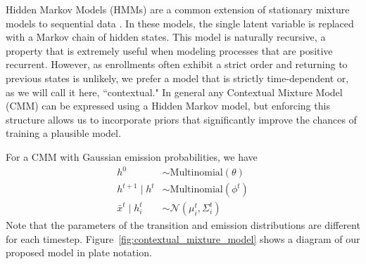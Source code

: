 \documentclass{edm_template}
\begin{document}
Hidden Markov Models (HMMs) are a common extension of stationary mixture models to sequential data \cite{rabiner1989tutorial}. In these models, the single latent variable is replaced with a Markov chain of hidden states. This model is naturally recursive, a property that is extremely useful when modeling processes that are positive recurrent. However, as enrollments often exhibit a strict order and returning to previous states is unlikely, we prefer a model that is strictly time-dependent or, as we will call it here, ``contextual." In general any Contextual Mixture Model (CMM) can be expressed using a Hidden Markov model, but enforcing this structure allows us to incorporate priors that significantly improve the chances of training a plausible model.

For a CMM with Gaussian emission probabilities, we have 
\begin{align*}
h^0 &\sim \text{Multinomial}(\theta) \\    
h^{t+1} \mid h^{t} &\sim \text{Multinomial}(\phi^t) \\
\bar{x}^{t} \mid h_i^{t} &\sim \mathcal{N}(\mu^t_i, \Sigma^t_i)
\end{align*}
Note that the parameters of the transition and emission distributions are different for each timestep. Figure~\ref{fig:contextual_mixture_model} shows a diagram of our proposed model in plate notation.
\end{document}
